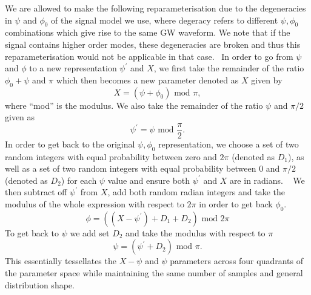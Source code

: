 We are allowed to make the following reparameterisation due to the degeneracies 
in $\psi$ and $\phi_0$ of the signal model we use, where degeracy refers to different 
$\psi,\phi_0$ combinations which give rise to the same \ac{GW} waveform. We note that 
if the signal contains higher order modes, these degeneracies are broken and thus 
this reparameterisation would not be applicable in that case.~
In order to go from $\psi$ and $\phi$ to a new representation $\psi^{'}$ and $X$, 
we first take the remainder of the ratio 
$\phi_0+\psi$ and $\pi$ which then becomes a new parameter denoted as $X$ given by
%
\begin{equation}
    X = (\psi + \phi_0) \textrm{ mod } \pi,
\end{equation}
%
where ``mod'' is the modulus. We also take the remainder 
of the ratio $\psi$ and $\pi/2$ given as
%
\begin{equation}
    \psi^{'} = \psi \textrm{ mod } \frac{\pi}{2}.
\end{equation}
%
In order to get back to the original $\psi, \phi_0$ representation, we 
choose a set of two random integers with equal probability between zero and 
$2\pi$ (denoted as $D_1$), as well as a 
set of two random integers with equal probability between $0$ and $\pi/2$ (denoted as $D_2$) 
for each $\psi$ value and ensure both $\psi^{'}$ and 
$X$ are in radians.
~ We then subtract off $\psi^{'}$ from $X$, add both random radian integers and take the modulus  of the whole expression with respect to $2\pi$ in order to get back $\phi_0$. 
%
\begin{equation}
    \phi = ((X - \psi^{'}) + D_{1} + D_{2}) \textrm{ mod } 2\pi     
\end{equation}
%
To get back to $\psi$ we add set 
$D_2$ and take the modulus with respect to $\pi$
%
\begin{equation}
    \psi = (\psi^{'} + D_2) \textrm{ mod } \pi.
\end{equation}
%
This essentially tessellates the $X-\psi$ and $\psi$ parameters across four quadrants of the parameter space while maintaining the same number of samples and general distribution shape.~

